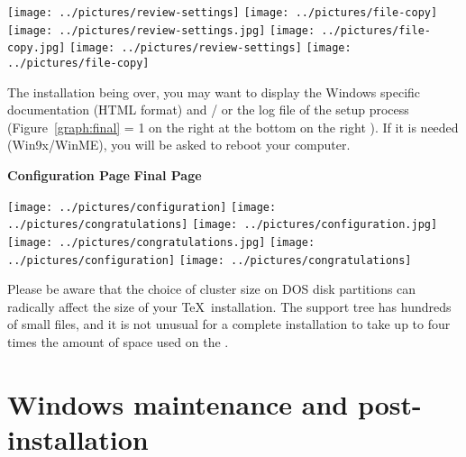 \documentclass{article}
\begin{document}
\begin{description}
\begin{figure*}[!htb]
  \begin{center}
  \ifnum {}
      \texttt{[image: ../pictures/review-settings]}\hfill%
      \texttt{[image: ../pictures/file-copy]}
  \else
    \ifnum {}
          \texttt{[image: ../pictures/review-settings.jpg]}\hfill%
          \texttt{[image: ../pictures/file-copy.jpg]}
    \else
          \texttt{[image: ../pictures/review-settings]}\hfill%
          \texttt{[image: ../pictures/file-copy]}%
    \fi
  \fi
 \end{center}
 \caption{Review Page / File Copy Page}
 \label{graph:review}\label{graph:file-copy}
\end{figure*}
\item[Final Page] The installation being over, you may want to display
  the Windows specific documentation (HTML format) and / or the log
  file of the setup process  (Figure~\ref{graph:final}
  \ifnum \Status = 1
  on the right%
  \else\ifnum {}
  at the bottom%
  \else
  on the right%
  \fi\fi
  ). If it is needed (Win9x/WinME), you will
  be asked to reboot your computer.
\end{description}

\begin{figure*}[!htb]
  \textbf{Configuration Page}\hfill%
  \textbf{Final Page}
  \begin{center}
  \ifnum {}
      \texttt{[image: ../pictures/configuration]}\hfill%
      \texttt{[image: ../pictures/congratulations]}
  \else
    \ifnum {}
          \texttt{[image: ../pictures/configuration.jpg]}\hfill%
          \texttt{[image: ../pictures/congratulations.jpg]}
    \else
          \texttt{[image: ../pictures/configuration]}\hfill%
          \texttt{[image: ../pictures/congratulations]}%
    \fi
  \fi
 \end{center}
 \caption{Configuration Page / Final page}
\label{graph:configuration}\label{graph:final}
\end{figure*}

Please be aware that the choice of cluster size on DOS disk
partitions can radically affect the size of your \TeX\
installation. The support tree has hundreds of small files, and it is
not unusual for a complete installation to take up to four times the
amount of space used on the \CD.


\section{Windows maintenance and post-installation}
\end{document}
